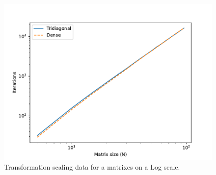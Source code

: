 \documentclass[english,notitlepage]{revtex4-1}  %
\begin{document}
\begin{figure}[H]
    \centering
    \includegraphics[width=1.\textwidth]{../figures/N_iter_log_both.pdf}
    \caption{Transformation scaling data for a matrixes on a Log scale.}
    \label{fig:N_iter_log_both}
\end{figure}


\newpage
\end{document}
